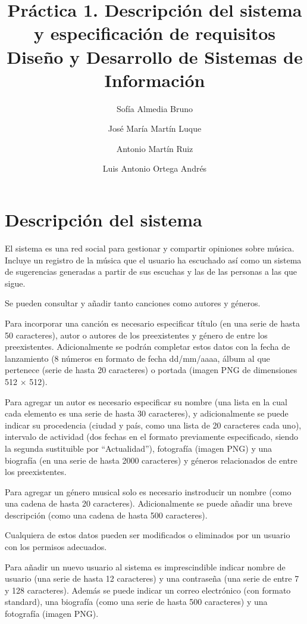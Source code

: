 \documentclass[
  12pt,
  a4paper,
  DIV=12,
  spanish,
]{scrartcl}
\title{Práctica 1. Descripción del sistema y especificación de requisitos \\\large Diseño y Desarrollo de Sistemas de Información}
\author{Sofía Almedia Bruno \and José María Martín Luque \and Antonio Martín Ruiz \and Luis Antonio Ortega Andrés}
\begin{document}
\maketitle

\section{Descripción del sistema} %

El sistema es una red social para gestionar y compartir opiniones sobre música. Incluye un registro de la música que el usuario ha escuchado así como un sistema de sugerencias generadas a partir de sus escuchas y las de las personas a las que sigue.

Se pueden consultar y añadir tanto canciones como autores y géneros. 

Para incorporar una canción es necesario especificar título (en una serie de hasta 50 caracteres), autor o autores de los preexistentes y género de entre los preexistentes. Adicionalmente se podrán completar estos datos con la fecha de lanzamiento (8 números en formato de fecha dd/mm/aaaa, álbum al que pertenece (serie de hasta 20 caracteres) o portada (imagen PNG de dimensiones 512 $\times$ 512).

Para agregar un autor es necesario especificar su nombre (una lista en la cual cada elemento es una serie de hasta 30 caracteres), y adicionalmente se puede indicar su procedencia (ciudad y país, como una lista de 20 caracteres cada uno), intervalo de actividad (dos fechas en el formato previamente especificado, siendo la segunda sustituible por ``Actualidad''), fotografía (imagen PNG) y una biografía (en una serie de hasta 2000 caracteres) y géneros relacionados de entre los preexistentes.

Para agregar un género musical solo es necesario instroducir un nombre (como una cadena de hasta 20 caracteres). Adicionalmente se puede añadir una breve descripción (como una cadena de hasta 500 caracteres).

Cualquiera de estos datos pueden ser modificados o eliminados por un usuario con los permisos adecuados.


Para añadir un nuevo usuario al sistema es imprescindible indicar nombre de usuario (una serie de hasta 12 caracteres) y una contraseña (una serie de entre 7 y 128 caracteres). Además se puede indicar un correo electrónico (con formato standard), una biografía (como una serie de hasta 500 caracteres) y una fotografía (imagen PNG). 
\end{document}
